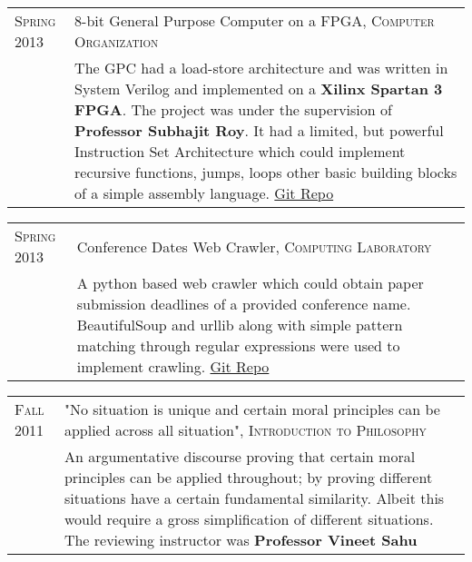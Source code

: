 \documentclass[a4paper,10pt]{article} %
\begin{document}
\begin{tabular}{p{2.2cm}|p{14cm}}
    \textsc{Spring 2013} & 8-bit General Purpose Computer on a FPGA, \textsc{Computer Organization} \\
                         & \footnotesize{The GPC had a load-store architecture and was written in System Verilog and
                            implemented on a \textbf{Xilinx Spartan 3 FPGA}.  The project was under the
                            supervision of \textbf{Professor Subhajit Roy}.  It had a limited, but powerful
                            Instruction Set Architecture which could implement recursive functions, jumps,
                            loops  other basic building blocks of a simple assembly language.
                            \href{https://github.com/srijanshetty/220_y11} {Git Repo}} \\
\end{tabular}

\begin{tabular}{p{2.2cm}|p{14cm}}
    \textsc{Spring 2013} & Conference Dates Web Crawler, \textsc{Computing Laboratory} \\
                         & \footnotesize{A python based web crawler which could obtain paper submission
                            deadlines of a provided conference name.  BeautifulSoup and urllib along
                            with simple pattern matching through regular expressions were used to implement crawling.
                            \href{https://github.com/srijanshetty/crawler} {Git Repo} } \\
\end{tabular}

\begin{tabular}{p{2.2cm}|p{14cm}}
    \textsc{Fall 2011} & "No situation is unique and certain moral principles can be applied across all situation",
                         \textsc{Introduction to Philosophy} \\
                       & \footnotesize{ An argumentative discourse proving that certain moral principles
                         can be applied throughout; by proving different situations have a certain
                         fundamental similarity.  Albeit this would require a gross simplification of
                         different situations.  The reviewing instructor was \textbf{Professor Vineet Sahu}} \\
\end{tabular}

\end{document}
